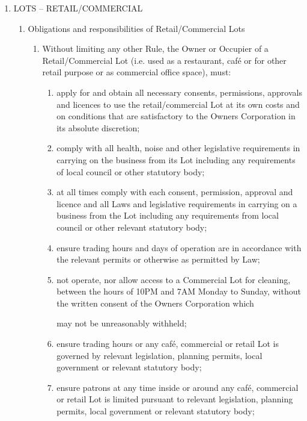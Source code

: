 \documentclass{article}
\begin{document}
\begin{enumerate}[label=\arabic*.]
\begin{enumerate}[label=\arabic{enumi}.\arabic*.]
\item  LOTS – RETAIL/COMMERCIAL

\begin{enumerate}[label=\arabic{enumi}.\arabic*.]

\item  Obligations and responsibilities of Retail/Commercial Lots

\begin{enumerate}[label=(\arabic*)]

\item  Without limiting any other Rule, the Owner or Occupier of a Retail/Commercial Lot (i.e. used as a restaurant, café or for other retail purpose or as commercial office space), must:

\begin{enumerate}[label=(\alph*)]

\item  apply for and obtain all necessary consents, permissions, approvals and licences to use the retail/commercial Lot at its own costs and on conditions that are satisfactory to the Owners Corporation in its absolute discretion;

\item  comply with all health, noise and other legislative requirements in carrying on the business from its Lot including any requirements of local council or other statutory body;

\item  at all times comply with each consent, permission, approval and licence and all Laws and legislative requirements in carrying on a business from the Lot including any requirements from local council or other relevant statutory body;

\item  ensure trading hours and days of operation are in accordance with the relevant permits or otherwise as permitted by Law;

\item  not operate, nor allow access to a Commercial Lot for cleaning, between the hours of 10PM and 7AM Monday to Sunday, without the written consent of the Owners Corporation which
\newpage

may not be unreasonably withheld;

\item  ensure trading hours or any café, commercial or retail Lot is governed by relevant legislation, planning permits, local government or relevant statutory body;

\item  ensure patrons at any time inside or around any café, commercial or retail Lot is limited pursuant to relevant legislation, planning permits, local government or relevant statutory body;


\end{enumerate}
\end{enumerate}
\end{enumerate}
\end{enumerate}
\end{enumerate}
\end{document}
